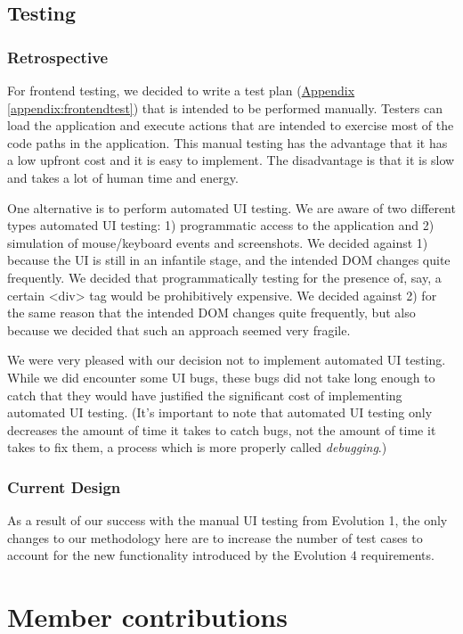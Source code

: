 \documentclass[12pt]{article}
\begin{document}
\subsection{Testing}
\subsubsection{Retrospective}
For frontend testing, we decided to write a test plan (\hyperref[appendix:frontendtest]{Appendix \ref{appendix:frontendtest}}) that is intended to be performed manually. Testers can load the application and execute actions that are intended to exercise most of the code paths in the application. This manual testing has the advantage that it has a low upfront cost and it is easy to implement. The disadvantage is that it is slow and takes a lot of human time and energy.

One alternative is to perform automated UI testing. We are aware of two different types automated UI testing: 1) programmatic access to the application and 2) simulation of mouse/keyboard events and screenshots. We decided against 1) because the UI is still in an infantile stage, and the intended DOM changes quite frequently. We decided that programmatically testing for the presence of, say, a certain <div> tag would be prohibitively expensive. We decided against 2) for the same reason that the intended DOM changes quite frequently, but also because we decided that such an approach seemed very fragile.

We were very pleased with our decision not to implement automated UI testing. While we did encounter some UI bugs, these bugs did not take long enough to catch that they would have justified the significant cost of implementing automated UI testing. (It's important to note that automated UI testing only decreases the amount of time it takes to catch bugs, not the amount of time it takes to fix them, a process which is more properly called \emph{debugging}.)

\subsubsection{Current Design}
As a result of our success with the manual UI testing from Evolution 1, the only changes to our methodology here are to increase the number of test cases to account for the new functionality introduced by the Evolution 4 requirements.

\section{Member contributions}
\end{document}
